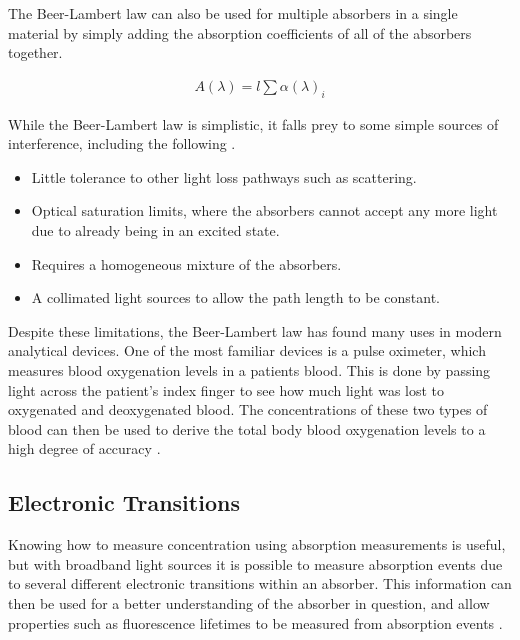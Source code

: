 The Beer-Lambert law can also be used for multiple absorbers in a single material by simply adding the absorption coefficients of all of the absorbers together.

\begin{align*}
  A(\lambda) = l\sum\alpha(\lambda)_i
\end{align*}

While the Beer-Lambert law is simplistic, it falls prey to some simple sources of interference, including the following \cite{Skoog:1994wg}.
\begin{itemize}
  \item Little tolerance to other light loss pathways such as scattering.
  \item Optical saturation limits, where the absorbers cannot accept any more light due to already being in an excited state.
  \item Requires a homogeneous mixture of the absorbers.
  \item A collimated light sources to allow the path length to be constant.
\end{itemize}


Despite these limitations, the Beer-Lambert law has found many uses in modern
analytical devices. One of the most familiar devices is a pulse oximeter, which
measures blood oxygenation levels in a patients blood. This is done by passing
light across the patient's index finger to see how much light was lost to
oxygenated and deoxygenated blood. The concentrations of these two types of
blood can then be used to derive the total body blood oxygenation levels to a
high degree of accuracy \cite{Wukitsch:1987tb}.



\subsection{Electronic Transitions}\label{subsec:elec_trans}


Knowing how to measure concentration using absorption measurements is useful,
but with broadband light sources it is possible to measure absorption events
due to several different electronic transitions within an absorber. This
information can then be used for a better understanding of the absorber in
question, and allow properties such as fluorescence lifetimes to be measured
from absorption events \cite{Werts:2002fs}.

